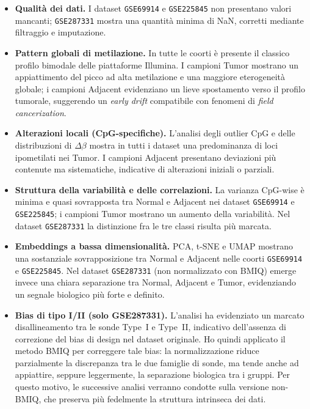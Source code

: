 \documentclass[10pt]{extarticle}
\begin{document}
\begin{itemize}[label=-]

    \item \textbf{Qualità dei dati.}  
    I dataset \texttt{GSE69914} e \texttt{GSE225845} non presentano valori mancanti; \texttt{GSE287331} mostra una quantità minima di NaN,
    corretti mediante filtraggio e imputazione. 

    \item \textbf{Pattern globali di metilazione.}  
    In tutte le coorti è presente il classico profilo bimodale delle piattaforme Illumina. I campioni Tumor mostrano un
    appiattimento del picco ad alta metilazione e una maggiore eterogeneità globale; i campioni Adjacent evidenziano un
    lieve spostamento verso il profilo tumorale, suggerendo un \textit{early drift} compatibile con fenomeni di 
    \textit{field cancerization}.

    \item \textbf{Alterazioni locali (CpG-specifiche).}  
    L’analisi degli outlier CpG e delle distribuzioni di $\Delta\beta$ mostra in tutti i dataset una predominanza di loci
    ipometilati nei Tumor. I campioni Adjacent presentano deviazioni più contenute ma sistematiche, indicative di
    alterazioni iniziali o parziali.

    \item \textbf{Struttura della variabilità e delle correlazioni.}  
    La varianza CpG-wise è minima e quasi sovrapposta tra Normal e Adjacent nei dataset \texttt{GSE69914} e \texttt{GSE225845};
    i campioni Tumor mostrano un aumento della variabilità. Nel dataset \texttt{GSE287331} la distinzione fra le tre classi
    risulta più marcata.

    \item \textbf{Embeddings a bassa dimensionalità.}  
    PCA, t-SNE e UMAP mostrano una sostanziale sovrapposizione tra Normal e Adjacent nelle coorti \texttt{GSE69914} e
    \texttt{GSE225845}. Nel dataset \texttt{GSE287331} (non normalizzato con BMIQ) emerge invece una chiara separazione tra
    Normal, Adjacent e Tumor, evidenziando un segnale biologico più forte e definito.

    \item \textbf{Bias di tipo I/II (solo GSE287331).}  
    L’analisi ha evidenziato un marcato disallineamento tra le sonde Type~I e Type~II, indicativo dell’assenza di correzione
    del bias di design nel dataset originale. Ho quindi applicato il metodo BMIQ per correggere tale bias: la normalizzazione
    riduce parzialmente la discrepanza tra le due famiglie di sonde, ma tende anche ad appiattire, seppure leggermente, la
    separazione biologica tra i gruppi. Per questo motivo, le successive analisi verranno condotte sulla versione non-BMIQ,
    che preserva più fedelmente la struttura intrinseca dei dati.

\end{itemize}
\end{document}
